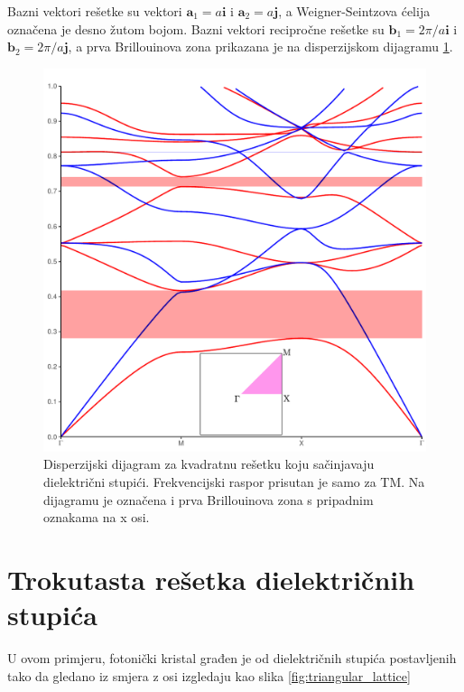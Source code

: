 \documentclass[utf8, seminar]{fer}
\begin{document}
Bazni vektori rešetke su vektori ${\mathbf{a}_1 = a \mathbf{i}}$ i
${\mathbf{a}_2= a \mathbf{j}}$, a Weigner-Seintzova ćelija označena je
desno žutom bojom. Bazni vektori recipročne rešetke su
${\mathbf{b}_1 = 2 \pi/a \mathbf{i}}$ i
${\mathbf{b}_2 = 2 \pi/a \mathbf{j}}$, a prva Brillouinova zona prikazana
je na disperzijskom dijagramu \ref{fig:square_band_diagram}.

\begin{figure}[ht]
	\centering
	\includegraphics[width = 1.0\linewidth]{./images/square.pdf}
	\caption{Disperzijski dijagram za kvadratnu rešetku koju sačinjavaju
	dielektrični stupići. Frekvencijski raspor prisutan je samo za TM. Na
	dijagramu je označena i prva Brillouinova zona s pripadnim oznakama na x osi.}
	\label{fig:square_band_diagram}
\end{figure}

\FloatBarrier

\section{Trokutasta rešetka dielektričnih stupića} \label{sec:triangle}

U ovom primjeru, fotonički kristal građen je od dielektričnih stupića
postavljenih tako da gledano iz smjera z osi izgledaju kao
slika \ref{fig:triangular_lattice}
\end{document}
